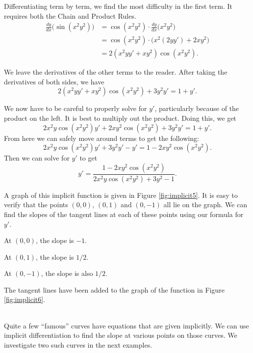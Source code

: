 {Differentiating term by term, we find the most difficulty in the first term.  It requires both the Chain and Product Rules.
		\begin{align*}
		\frac{dy}{dx}\Big(\sin(x^2y^2)\Big) &= \cos(x^2y^2)\cdot\frac{dy}{dx}\Big(x^2y^2\Big) \\
																				&= \cos(x^2y^2)\cdot\big(x^2(2yy')+2xy^2\big)\\
																				&= 2(x^2yy'+xy^2)\cos(x^2y^2).
		\end{align*}  

We leave the derivatives of the other terms to the reader. After taking the derivatives of both sides, we have
$$2(x^2yy'+xy^2)\cos(x^2y^2) + 3y^2y' = 1 + y'.$$

We now have to be careful to properly solve for $y'$, particularly because of the product on the left.  It is best to multiply out the product.  Doing this, we get
$$2x^2y\cos(x^2y^2)y' + 2xy^2\cos(x^2y^2) + 3y^2y' = 1 + y'.$$
From here we can safely move around terms to get the following:
$$2x^2y\cos(x^2y^2)y' + 3y^2y' - y' = 1 - 2xy^2\cos(x^2y^2).$$
Then we can solve for $y'$ to get
$$y' = \frac{1 - 2xy^2\cos(x^2y^2)}{2x^2y\cos(x^2y^2)+3y^2-1}.$$

A graph of this implicit function is given in Figure \ref{fig:implicit5}. It is easy to verify that the points $(0,0)$, $(0,1)$ and $(0,-1)$ all lie on the graph. We can find the slopes of the tangent lines at each of these points using our formula for $y'$. 


At $(0,0)$, the slope is $-1$.

At $(0,1)$, the slope is $1/2$.

At $(0,-1)$, the slope is also $1/2$.

The tangent lines have been added to the graph of the function in Figure \ref{fig:implicit6}.
}\\


Quite a few ``famous'' curves have equations that are given implicitly.  We can use implicit differentiation to find the slope at various points on those curves. We investigate two such curves in the next examples.\\

